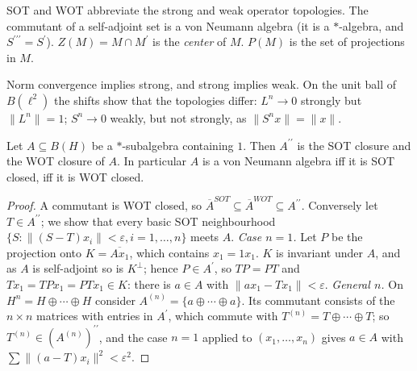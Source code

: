 \begin{notation}\label{operator-algebras:notation-von-neumann}
SOT and WOT abbreviate the strong and weak operator topologies. The commutant of a self-adjoint set is a von Neumann algebra (it is a $*$-algebra, and $S^{\prime\prime\prime} = S^{\prime}$). $Z(M) = M \cap M^{\prime}$ is the
\emph{center} of $M$. $P(M)$ is the set of projections in $M$.
\end{notation}

Norm convergence implies strong, and strong implies weak. On the unit ball of $B(\ell^2)$ the shifts show that the topologies differ: $L^n \to 0$ strongly but $\|L^n\| = 1$; $S^n \to 0$ weakly, but not strongly, as
$\|S^nx\| = \|x\|$.

\begin{theorem}\label{operator-algebras:theorem-bicommutant}
Let $A \subseteq B(H)$ be a $*$-subalgebra containing $1$. Then $A^{\prime\prime}$ is the SOT closure and the WOT closure of $A$. In particular $A$ is a von Neumann algebra iff it is SOT closed, iff it is WOT closed.
\end{theorem}

\begin{proof}
A commutant is WOT closed, so $\overline{A}^{SOT} \subseteq \overline{A}^{WOT} \subseteq A^{\prime\prime}$. Conversely let $T \in A^{\prime\prime}$; we show that every basic SOT neighbourhood
$\{S : \|(S - T)x_i\| < \varepsilon, i = 1, \ldots, n\}$ meets $A$. \emph{Case $n = 1$.} Let $P$ be the projection onto $K = \overline{Ax_1}$, which contains $x_1 = 1x_1$. $K$ is invariant under $A$, and as $A$ is self-adjoint so is
$K^\perp$; hence $P \in A^{\prime}$, so $TP = PT$ and $Tx_1 = TPx_1 = PTx_1 \in K$: there is $a \in A$ with $\|ax_1 - Tx_1\| < \varepsilon$. \emph{General $n$.} On $H^n = H \oplus \cdots \oplus H$ consider
$A^{(n)} = \{a \oplus \cdots \oplus a\}$. Its commutant consists of the $n \times n$ matrices with entries in $A^{\prime}$, which commute with $T^{(n)} = T \oplus \cdots \oplus T$; so $T^{(n)} \in (A^{(n)})^{\prime\prime}$, and the case
$n = 1$ applied to $(x_1, \ldots, x_n)$ gives $a \in A$ with $\sum\|(a - T)x_i\|^2 < \varepsilon^2$.
\end{proof}

